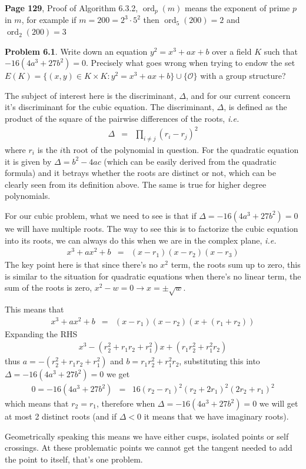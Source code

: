 \documentclass[aps,preprint,preprintnumbers,nofootinbib,showpacs,prd]{revtex4-1}
\newcommand{\ie}{{\it i.e.} }
\newcommand{\nbea}{\begin{eqnarray*}}
\newcommand{\neea}{\end{eqnarray*}}
\DeclareMathOperator{\ord}{ord}
\begin{document}
{\bf Page 129}, Proof of Algorithm 6.3.2, $\ord_p(m)$ means the exponent of prime $p$ in $m$, for example if $m = 200 = 2^3 \cdot 5^2$ then $\ord_5(200) = 2$ and $\ord_2(200) = 3$

{\bf Problem 6.1}. Write down an equation $y^2 = x^3 + ax + b$ over a field $K$ such that
$-16(4a^3 +27b^2 ) = 0$. Precisely what goes wrong when trying to endow the set $E(K) = \{(x, y) \in K \times K : y^2 = x^3 + ax + b\} \cup \{\mathcal{O}\}$ with a group structure?

The subject of interest here is the discriminant, $\Delta$, and for our current concern it's discriminant for the cubic equation. The discriminant, $\Delta$, is defined as the product of the square of the pairwise differences of the roots, \ie
%
\nbea
\Delta & = & \prod_{i \neq j} (r_i - r_j)^2
\neea
%
where $r_i$ is the $i$th root of the polynomial in question. For the quadratic equation it is given by $\Delta = b^2 - 4ac$ (which can be easily derived from the quadratic formula) and it betrays whether the roots are distinct or not, which can be clearly seen from its definition above. The same is true for higher degree polynomials.

For our cubic problem, what we need to see is that if $\Delta = -16(4a^3 +27b^2) = 0$ we will have multiple roots. The way to see this is to factorize the cubic equation into its roots, we can always do this when we are in the complex plane, \ie
%
\nbea
x^3 + ax^2 + b & = & (x-r_1)(x-r_2)(x-r_3)
\neea
%
The key point here is that since there's no $x^2$ term, the roots sum up to zero, this is similar to the situation for quadratic equations when there's no linear term, the sum of the roots is zero, $x^2 - w = 0 \to x = \pm\sqrt{w}$.

This means that
%
\nbea
x^3 + ax^2 + b & = & (x-r_1)(x-r_2)(x+(r_1+r_2))
\neea
%
Expanding the RHS
%
\nbea
x^3-(r_2^2+r_1r_2+r_1^2)x+(r_1r_2^2+r_1^2r_2)
\neea
%
thus $a = -(r_2^2+r_1r_2+r_1^2)$ and $b = r_1r_2^2+r_1^2r_2$, substituting this into $\Delta = -16(4a^3 +27b^2 ) = 0$ we get
%
\nbea
0 = -16(4a^3 +27b^2) & = & 16(r_2-r_1)^2(r_2+2r_1)^2(2r_2+r_1)^2
\neea
%
which means that $r_2 = r_1$, therefore when $\Delta = -16(4a^3 +27b^2 ) = 0$ we will get at most 2 distinct roots (and if $\Delta < 0$ it means that we have imaginary roots).

Geometrically speaking this means we have either cusps, isolated points or self crossings. At these problematic points we cannot get the tangent needed to add the point to itself, that's one problem.
\end{document}

